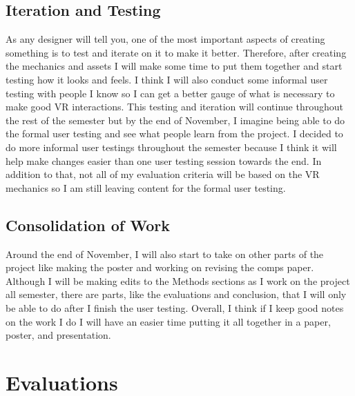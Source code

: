 \documentclass[11pt,twocolumn]{article}
\begin{document}
\subsection{Iteration and Testing}
As any designer will tell you, one of the most important aspects of creating something is to test and iterate on it to make it better. Therefore, after creating the mechanics and assets I will make some time to put them together and start testing how it looks and feels. I think I will also conduct some informal user testing with people I know so I can get a better gauge of what is necessary to make good VR interactions. This testing and iteration will continue throughout the rest of the semester but by the end of November, I imagine being able to do the formal user testing and see what people learn from the project. I decided to do more informal user testings throughout the semester because I think it will help make changes easier than one user testing session towards the end. In addition to that, not all of my evaluation criteria will be based on the VR mechanics so I am still leaving content for the formal user testing.

 
\subsection{Consolidation of Work}
Around the end of November, I will also start to take on other parts of the project like making the poster and working on revising the comps paper. Although I will be making edits to the Methods sections as I work on the project all semester, there are parts, like the evaluations and conclusion, that I will only be able to do after I finish the user testing. Overall, I think if I keep good notes on the work I do I will have an easier time putting it all together in a paper, poster, and presentation. 




\section{Evaluations}
\end{document}
